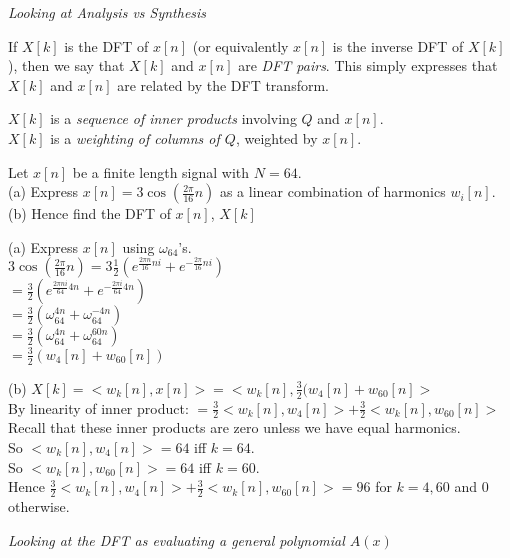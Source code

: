 \textit{Looking at Analysis vs Synthesis}



If $X[k]$ is the DFT of $x[n]$ (or equivalently $x[n]$ is the inverse DFT of $X[k]$), 
then we say that $X[k]$ and $x[n]$ are \textit{DFT pairs}. This simply expresses that 
$X[k]$ and $x[n]$ are related by the DFT transform. 

$X[k]$ is a \textit{sequence of inner products} involving $Q$ and $x[n]$.\\
$X[k]$ is a \textit{weighting of columns of $Q$}, weighted by $x[n]$.\\

\frmrule 

\begin{example}
Let $x[n]$ be a finite length signal with $N=64$. \\
(a) Express $x[n] = 3\cos(\frac{2\pi}{16}n)$ as a 
linear combination of harmonics $w_i[n]$. \\
(b) Hence find the DFT of $x[n]$, $X[k]$

(a) Express $x[n]$ using $\omega_{64}$'s. \\
$3\cos(\frac{2\pi}{16}n) = 3\frac{1}{2}(e^{\frac{2\pi n}{16}ni} + e^{-\frac{2\pi}{16}ni})$ \\
$=\frac{3}{2}(e^{\frac{2\pi ni}{64}4n} + e^{-\frac{2\pi i}{64}4n})$\\
$=\frac{3}{2}(\omega^{4n}_{64} + \omega^{-4n}_{64})$ \\
$=\frac{3}{2}(\omega^{4n}_{64} + \omega^{60n}_{64})$ \\
$=\frac{3}{2}(w_4[n] + w_{60}[n])$ 

(b) $X[k] = <w_k[n],x[n]> = <w_k[n],\frac{3}{2}(w_4[n] + w_{60}[n]>$ \\
By linearity of inner product: $= \frac{3}{2}<w_k[n],w_4[n]> + \frac{3}{2}<w_k[n],w_{60}[n]>$ \\
Recall that these inner products are zero unless we have equal harmonics. \\
So $<w_k[n],w_4[n]> = 64$ iff $k=64$. \\
So $<w_k[n],w_{60}[n]> = 64$ iff $k=60$. \\
Hence $\frac{3}{2}<w_k[n],w_4[n]> + \frac{3}{2}<w_k[n],w_{60}[n]> = 96$ for $k=4,60$ and 0 otherwise.

\end{example}

\frmrule 



\frmrule 

\textit{Looking at the DFT as evaluating a general polynomial $A(x)$ }


